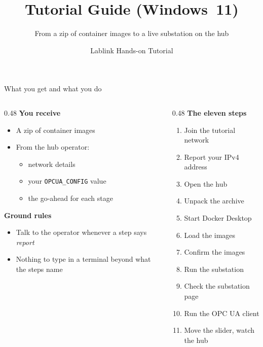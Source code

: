 \documentclass[aspectratio=169,10pt]{beamer}
\title{Tutorial Guide (Windows~11)}
\subtitle{From a zip of container images to a live substation on the hub}
\author{Lablink Hands-on Tutorial}
\date{}
\newcommand{\cmd}[1]{\texttt{#1}}               %
\begin{document}
\maketitle

\begin{frame}{What you get and what you do}
  \begin{columns}[T]
    \begin{column}{0.48\textwidth}
      \textbf{You receive}
      \begin{itemize}
        \item A zip of container images
        \item From the hub operator:
          \begin{itemize}
            \item network details
            \item your \cmd{OPCUA\_CONFIG} value
            \item the go-ahead for each stage
          \end{itemize}
      \end{itemize}
      \vspace{0.3em}
      \textbf{Ground rules}
      \begin{itemize}
        \item Talk to the operator whenever a step says \emph{report}
        \item Nothing to type in a terminal beyond what the steps name
      \end{itemize}
    \end{column}
    \begin{column}{0.48\textwidth}
      \textbf{The eleven steps}
      \footnotesize
      \begin{enumerate}\setlength{\itemsep}{0pt}
        \item Join the tutorial network
        \item Report your IPv4 address
        \item Open the hub
        \item Unpack the archive
        \item Start Docker Desktop
        \item Load the images
        \item Confirm the images
        \item Run the substation
        \item Check the substation page
        \item Run the OPC UA client
        \item Move the slider, watch the hub
      \end{enumerate}
    \end{column}
  \end{columns}
\end{frame}
\end{document}
